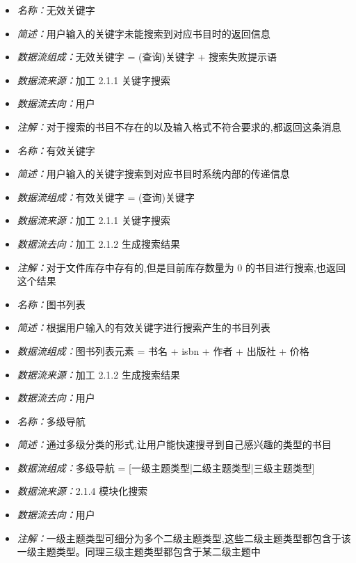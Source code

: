 \documentclass{article}
\begin{document}
\begin{CJK*}{UTF8}{gbsn}
\vspace{-1mm}

\begin{itemize}
	\item \textit{名称：}无效关键字
	\item \textit{简述：}用户输入的关键字未能搜索到对应书目时的返回信息
	\item \textit{数据流组成：}无效关键字 = (查询)关键字 + 搜索失败提示语
	\item \textit{数据流来源：}加工 2.1.1 关键字搜索
	\item \textit{数据流去向：}用户
	\item \textit{注解：}对于搜索的书目不存在的以及输入格式不符合要求的,都返回这条消息
\end{itemize}

\vspace{-1mm}

\begin{itemize}
	\item \textit{名称：}有效关键字
	\item \textit{简述：}用户输入的关键字搜索到对应书目时系统内部的传递信息
	\item \textit{数据流组成：}有效关键字 = (查询)关键字
	\item \textit{数据流来源：}加工 2.1.1 关键字搜索
	\item \textit{数据流去向：}加工 2.1.2 生成搜索结果
	\item \textit{注解：}对于文件库存中存有的,但是目前库存数量为 0 的书目进行搜索,也返回这个结果
\end{itemize}

\vspace{-1mm}

\begin{itemize}
	\item \textit{名称：}图书列表
	\item \textit{简述：}根据用户输入的有效关键字进行搜索产生的书目列表
	\item \textit{数据流组成：}图书列表元素 = 书名 + isbn + 作者 + 出版社 + 价格
	\item \textit{数据流来源：}加工 2.1.2 生成搜索结果
	\item \textit{数据流去向：}用户
\end{itemize}

\vspace{-1mm}

\begin{itemize}
	\item \textit{名称：}多级导航
	\item \textit{简述：}通过多级分类的形式,让用户能快速搜寻到自己感兴趣的类型的书目
	\item \textit{数据流组成：}多级导航 = [一级主题类型|二级主题类型|三级主题类型]
	\item \textit{数据流来源：}2.1.4 模块化搜索
	\item \textit{数据流去向：}用户
	\item \textit{注解：}一级主题类型可细分为多个二级主题类型,这些二级主题类型都包含于该一级主题类型。同理三级主题类型都包含于某二级主题中
\end{itemize}


\end{CJK*}
\end{document}
